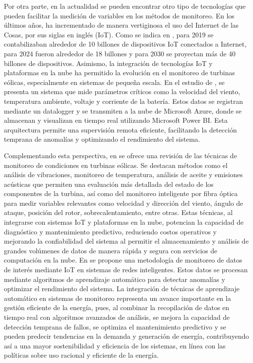 \documentclass[letterpaper,12pt, oneside]{book}
\begin{document}
Por otra parte, en la actualidad se pueden encontrar otro tipo de tecnologías que pueden facilitar la medición de variables en los métodos de monitoreo. En los últimos años, ha incrementado  de manera vertiginosa el uso del Internet de las Cosas, por sus siglas en inglés (IoT). Como se indica en \cite{ref33}, para 2019 se contabilizaban alrededor de 10 billones de dispositivos IoT conectados a Internet, para 2024 fueron alrededor de 18 billones y para 2030 se proyectan más de 40 billones de dispositivos. Asimismo, la integración de tecnologías IoT y plataformas en la nube ha permitido la evolución en el monitoreo de turbinas eólicas, especialmente en sistemas de pequeña escala. En el estudio de \cite{ref34}, se presenta un sistema que mide parámetros críticos como la velocidad del viento, temperatura ambiente, voltaje y corriente de la batería. Estos datos se registran mediante un datalogger y se transmiten a la nube de Microsoft Azure, donde se almacenan y visualizan en tiempo real utilizando Microsoft Power BI. Esta arquitectura permite una supervisión remota eficiente, facilitando la detección temprana de anomalías y optimizando el rendimiento del sistema. 

Complementando esta perspectiva, en \cite{ref35}\cite{ref42} se ofrece una revisión de las técnicas de monitoreo de condiciones en turbinas eólicas. Se destacan métodos como el análisis de vibraciones, monitoreo de temperatura, análisis de aceite y emisiones acústicas que permiten una evaluación más detallada del estado de los componentes de la turbina, así como del monitoreo inteligente por fibra óptica para medir variables relevantes como velocidad y dirección del viento, ángulo de ataque, posición del rotor, sobrecalentamiento, entre otras. Estas técnicas, al integrarse con sistemas IoT y plataformas en la nube, potencian la capacidad de diagnóstico y mantenimiento predictivo, reduciendo costos operativos y mejorando la confiabilidad del sistema al permitir el almacenamiento y análisis de grandes volúmenes de datos de manera rápida y segura con servicios de computación en la nube. En \cite{ref36} se propone una metodología de monitoreo de datos de interés mediante IoT en sistemas de redes inteligentes. Estos datos se procesan mediante algoritmos de aprendizaje automático para detectar anomalías y optimizar el rendimiento del sistema. La integración de técnicas de aprendizaje automático en sistemas de monitoreo representa un avance importante en la gestión eficiente de la energía, pues, al combinar la recopilación de datos en tiempo real con algoritmos avanzados de análisis, se mejora la capacidad de detección temprana de fallos, se optimiza el mantenimiento predictivo y se pueden predecir tendencias en la demanda y generación de energía, contribuyendo así a una mayor sostenibilidad y eficiencia de los sistemas, en línea con las políticas sobre uso racional y eficiente de la energía.
\end{document}
